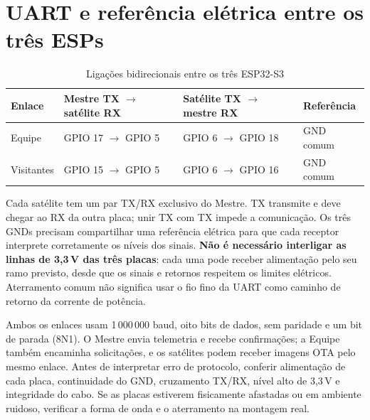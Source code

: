 \section{UART e referência elétrica entre os três ESPs}
\begin{table}[htbp]\centering\small
\caption{Ligações bidirecionais entre os três ESP32-S3}\label{tab:uart-fios}
\begin{tabularx}{\textwidth}{@{}p{2.2cm}X X p{1.8cm}@{}}\toprule
Enlace & Mestre TX $\to$ satélite RX & Satélite TX $\to$ mestre RX & Referência\\\midrule
Equipe & GPIO 17 $\to$ GPIO 5 & GPIO 6 $\to$ GPIO 18 & GND comum\\
Visitantes & GPIO 15 $\to$ GPIO 5 & GPIO 6 $\to$ GPIO 16 & GND comum\\\bottomrule
\end{tabularx}\end{table}
Cada satélite tem um par TX/RX exclusivo do Mestre. TX transmite e deve chegar ao RX da outra placa; unir TX com TX impede a comunicação. Os três GNDs precisam compartilhar uma referência elétrica para que cada receptor interprete corretamente os níveis dos sinais. \textbf{Não é necessário interligar as linhas de 3,3\,V das três placas}: cada uma pode receber alimentação pelo seu ramo previsto, desde que os sinais e retornos respeitem os limites elétricos. Aterramento comum não significa usar o fio fino da UART como caminho de retorno da corrente de potência.

Ambos os enlaces usam 1\,000\,000 baud, oito bits de dados, sem paridade e um bit de parada (8N1). O Mestre envia telemetria e recebe confirmações; a Equipe também encaminha solicitações, e os satélites podem receber imagens OTA pelo mesmo enlace. Antes de interpretar erro de protocolo, conferir alimentação de cada placa, continuidade do GND, cruzamento TX/RX, nível alto de 3,3\,V e integridade do cabo. Se as placas estiverem fisicamente afastadas ou em ambiente ruidoso, verificar a forma de onda e o aterramento na montagem real.

